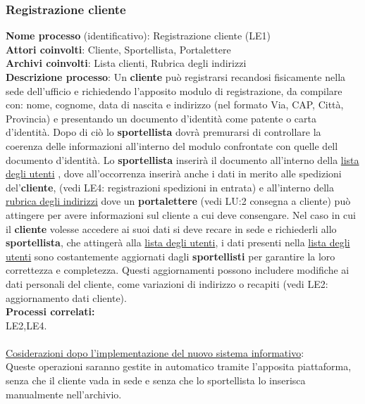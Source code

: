 \documentclass[a4paper,12pt]{article}
\begin{document}
\subsubsection{Registrazione cliente}
\textbf{Nome processo} (identificativo): Registrazione cliente (LE1) \\
\textbf{Attori coinvolti}: Cliente, Sportellista, Portalettere \\
\textbf{Archivi coinvolti}: Lista clienti, Rubrica degli indirizzi\\ 
\textbf{Descrizione processo}: Un \textbf{cliente} può registrarsi recandosi fisicamente nella sede dell'ufficio e richiedendo l'apposito modulo di registrazione, 
da compilare con: nome, cognome, data di nascita e indirizzo (nel formato Via, CAP, Città, Provincia) e presentando un documento d'identità come patente o carta d'identità. 
Dopo di ciò lo \textbf{sportellista} dovrà premurarsi di controllare la coerenza delle informazioni all'interno del modulo confrontate con quelle dell documento d'identità. 
Lo \textbf{sportellista} inserirà il documento all'interno della \underline{lista degli utenti} , dove all'occorrenza inserirà anche i dati in merito alle spedizioni 
del'\textbf{cliente}, (vedi LE4: registrazioni spedizioni in entrata) e all'interno della \underline{rubrica degli indirizzi} dove un \textbf{portalettere} 
(vedi LU:2 consegna a cliente) può attingere per avere informazioni sul cliente a cui deve consengare.  Nel caso in cui il \textbf{cliente} volesse accedere ai 
suoi dati si deve recare in sede e richiederli allo \textbf{sportellista}, che attingerà alla \underline{lista degli utenti}, i dati presenti nella 
\underline{lista degli utenti} sono costantemente aggiornati dagli \textbf{sportellisti} per garantire la loro correttezza e completezza. 
Questi aggiornamenti possono includere modifiche ai dati personali del cliente, come variazioni di indirizzo o recapiti (vedi LE2: aggiornamento dati cliente). \\
\textbf{Processi correlati:}\\LE2,LE4.\\ \\
\underline{Cosiderazioni dopo l'implementazione del nuovo sistema informativo}: \\ Queste operazioni saranno gestite in automatico tramite l'apposita piattaforma, 
senza che il cliente vada in sede e senza che lo sportellista lo inserisca manualmente nell'archivio.
\end{document}
